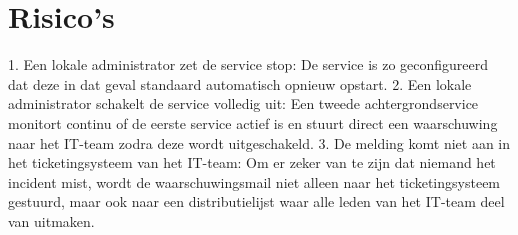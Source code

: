 
\section{Risico's}%
\label{vst:risicos}

%

1. Een lokale administrator zet de service stop: De service is zo geconfigureerd dat deze in dat geval standaard automatisch opnieuw opstart.
2. Een lokale administrator schakelt de service volledig uit: Een tweede achtergrondservice monitort continu of de eerste service actief is en stuurt direct een     waarschuwing naar het IT-team zodra deze wordt uitgeschakeld.
3. De melding komt niet aan in het ticketingsysteem van het IT-team: Om er zeker van te zijn dat niemand het incident mist, wordt de waarschuwingsmail niet alleen naar het ticketingsysteem gestuurd, maar ook naar een distributielijst waar alle leden van het IT-team deel van uitmaken.

